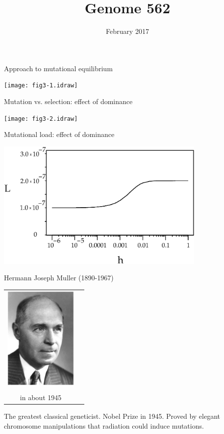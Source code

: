 \documentclass[bluish,slideColor,colorBG,pdf]{prosper}
\author{February 2017}
\title{Genome 562}
\begin{document}
\maketitle

\begin{slide}[Replace]{Approach to mutational equilibrium}

\centerline{\texttt{[image: fig3-1.idraw]}}

\end{slide}

\begin{slide}[Replace]{Mutation vs. selection: effect of dominance}

\centerline{\texttt{[image: fig3-2.idraw]}}

\end{slide}

\begin{slide}[Replace]{Mutational load: effect of dominance}

\centerline{\includegraphics[height=2.5in]{fig3-3.ps}}

\end{slide}

\begin{slide}[Replace]{Hermann Joseph Muller (1890-1967) }

\begin{center}
\begin{tabular}{c c}
\includegraphics[height=2in]{Muller1945ish.ps}\\
& \\
in about 1945 \\
\end{tabular}
\end{center}
\bigskip

The greatest classical geneticist. Nobel Prize in 1945. Proved by elegant
chromosome manipulations that radiation could induce mutations.

\end{slide}
\end{document}
